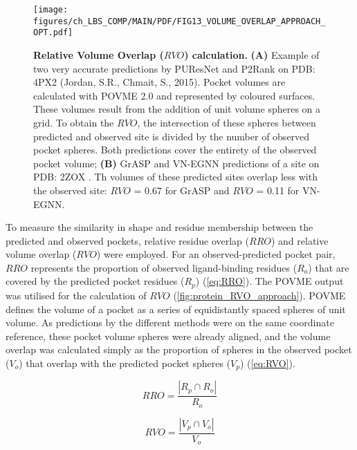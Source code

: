 \begin{figure}[htbp!]
    \centering
    \texttt{[image: figures/ch\_LBS\_COMP/MAIN/PDF/FIG13\_VOLUME\_OVERLAP\_APPROACH\_OPT.pdf]}
    \caption[Relative Volume Overlap ($RVO$) calculation]{\textbf{Relative Volume Overlap ($RVO$) calculation.} \textbf{(A)} Example of two very accurate predictions by PUResNet and P2Rank on PDB: 4PX2 (Jordan, S.R., Chmait, S., 2015). Pocket volumes are calculated with POVME 2.0 and represented by coloured surfaces. These volumes result from the addition of unit volume spheres on a grid. To obtain the $RVO$, the intersection of these spheres between predicted and observed site is divided by the number of observed pocket spheres. Both predictions cover the entirety of the observed pocket volume; \textbf{(B)} GrASP and VN-EGNN predictions of a site on PDB: 2ZOX \cite{NOGUCHI_2008_STRUCTURE}. Th volumes of these predicted sites overlap less with the observed site: $RVO$ = 0.67 for GrASP and $RVO$ = 0.11 for VN-EGNN.}
    \label{fig:protein_RVO_approach}
\end{figure}

\FloatBarrier

To measure the similarity in shape and residue membership between the predicted and observed pockets, relative residue overlap ($RRO$) and relative volume overlap ($RVO$) were employed. For an observed-predicted pocket pair, $RRO$ represents the proportion of observed ligand-binding residues ($R_{o}$) that are covered by the predicted pocket residues ($R_{p}$) (\autoref{eq:RRO}). The POVME output was utilised for the calculation of $RVO$ (\autoref{fig:protein_RVO_approach}). POVME defines the volume of a pocket as a series of equidistantly spaced spheres of unit volume. As predictions by the different methods were on the same coordinate reference, these pocket volume spheres were already aligned, and the volume overlap was calculated simply as the proportion of spheres in the observed pocket ($V_{o}$) that overlap with the predicted pocket spheres ($V_{p}$) (\autoref{eq:RVO}).

\begin{equation}
RRO = \frac{|R_p \cap R_o|}{R_o}
\label{eq:RRO}
\end{equation}

\begin{equation}
RVO = \frac{|V_p \cap V_o|}{V_o}
\label{eq:RVO}
\end{equation}

